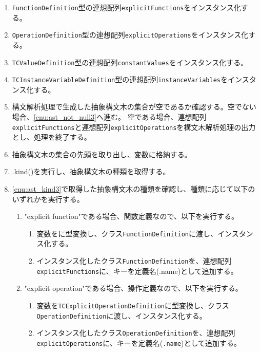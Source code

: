 \documentclass[uplatex, report, a4j, 10pt]{jsbook}
\newcommand\ttt[1]{\texttt{#1}}
\begin{document}
\begin{enumerate}
  \item \ttt{FunctionDefinition}型の連想配列\ttt{explicitFunctions}をインスタンス化する。
  \item \ttt{OperationDefinition}型の連想配列\ttt{explicitOperations}をインスタンス化する。
  \item \ttt{TCValueDefinition}型の連想配列\ttt{constantValues}をインスタンス化する。
  \item \ttt{TCInstanceVariableDefinition}型の連想配列\ttt{instanceVariables}をインスタンス化する。
  \item\label{enu:checkAstIsNull3} 構文解析処理で生成した抽象構文木の集合が空であるか確認する。空でない場合、\ref{enu:ast_not_null3}へ進む。
        空である場合、連想配列\ttt{explicitFunctions}と連想配列\ttt{explicitOperations}を構文木解析処理の出力とし、処理を終了する。
  \item\label{enu:ast_not_null3} 抽象構文木の集合の先頭を取り出し、変数\astDefinition{}に格納する。
  \item\label{enu:ast_kind3} \astDefinition{}.kind()を実行し、抽象構文木の種類を取得する。
  \item \ref{enu:ast_kind3}で取得した抽象構文木の種類を確認し、種類に応じて以下のいずれかを実行する。
        \begin{enumerate}
          \item "explicit function"である場合、関数定義なので、以下を実行する。
                \begin{enumerate}
                  \item 変数\astDefinition{}を\TCExplicitFunctionDefinition{}に型変換し、クラス\ttt{FunctionDefinition}に渡し、インスタンス化する。
                  \item インスタンス化したクラス\ttt{FunctionDefinition}を、連想配列\ttt{explicitFunctions}に、キーを定義名(\astDefinition{}.name)として追加する。
                \end{enumerate}
          \item "explicit operation"である場合、操作定義なので、以下を実行する。
                \begin{enumerate}
                  \item 変数\astDefinition{}を\ttt{TCExplicitOperationDefinition}に型変換し、クラス\ttt{OperationDefinition}に渡し、インスタンス化する。
                  \item インスタンス化したクラス\ttt{OperationDefinition}を、連想配列\ttt{explicitOperations}に、キーを定義名(\astDefinition{}\ttt{.name})として追加する。

\end{enumerate}
\end{enumerate}
\end{enumerate}
\end{document}
